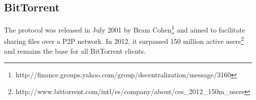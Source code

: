 \subsection{BitTorrent}
The protocol was released in July 2001 by Bram Cohen\footnote{http://finance.groups.yahoo.com/group/decentralization/message/3160} and aimed to facilitate sharing files over a P2P network. In 2012, it surpassed 150 million active users\footnote{http://www.bittorrent.com/intl/es/company/about/ces_2012_150m_users} and remains the base for all BitTorrent clients.